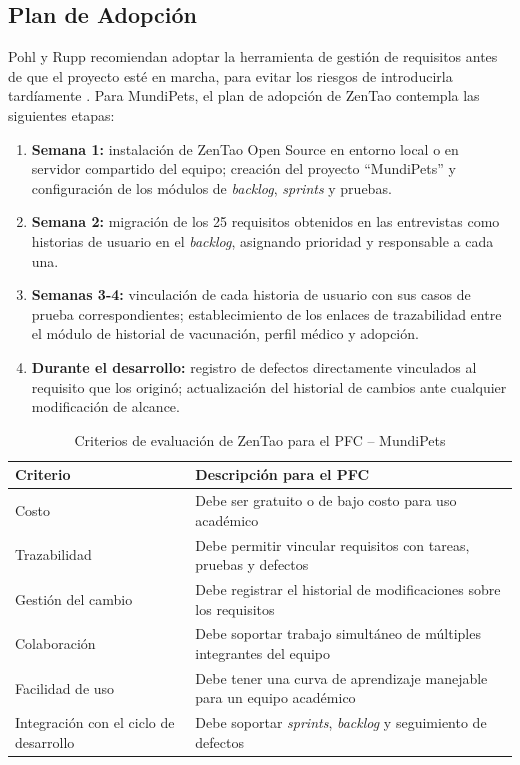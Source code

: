 \documentclass[journal,onecolumn]{IEEEtran}
\begin{document}
\subsection{Plan de Adopción}

Pohl y Rupp recomiendan adoptar la herramienta de gestión de requisitos antes de que el proyecto
esté en marcha, para evitar los riesgos de introducirla tardíamente \cite{pohl2015}. Para
MundiPets, el plan de adopción de ZenTao contempla las siguientes etapas:

\begin{enumerate}
  \item \textbf{Semana 1:} instalación de ZenTao Open Source en entorno local o en servidor
  compartido del equipo; creación del proyecto ``MundiPets'' y configuración de los módulos
  de \textit{backlog}, \textit{sprints} y pruebas.
  \item \textbf{Semana 2:} migración de los 25 requisitos obtenidos en las entrevistas como
  historias de usuario en el \textit{backlog}, asignando prioridad y responsable a cada una.
  \item \textbf{Semanas 3-4:} vinculación de cada historia de usuario con sus casos de prueba
  correspondientes; establecimiento de los enlaces de trazabilidad entre el módulo de historial
  de vacunación, perfil médico y adopción.
  \item \textbf{Durante el desarrollo:} registro de defectos directamente vinculados al requisito
  que los originó; actualización del historial de cambios ante cualquier modificación de alcance.
\end{enumerate}



\begin{table}[H]
	\caption{Criterios de evaluación de ZenTao para el PFC -- MundiPets}
	\label{tab:criterios}
	\begin{tabularx}{\textwidth}{|l|X|}
		\hline
		\textbf{Criterio} & \textbf{Descripción para el PFC} \\
		\hline
		Costo & Debe ser gratuito o de bajo costo para uso académico \\
		\hline
		Trazabilidad & Debe permitir vincular requisitos con tareas, pruebas y defectos \\
		\hline
		Gestión del cambio & Debe registrar el historial de modificaciones sobre los requisitos \\
		\hline
		Colaboración & Debe soportar trabajo simultáneo de múltiples integrantes del equipo \\
		\hline
		Facilidad de uso & Debe tener una curva de aprendizaje manejable para un equipo académico \\
		\hline
		Integración con el ciclo de desarrollo & Debe soportar \textit{sprints}, \textit{backlog} y seguimiento de defectos \\
		\hline
	\end{tabularx}
\end{table}
\end{document}
